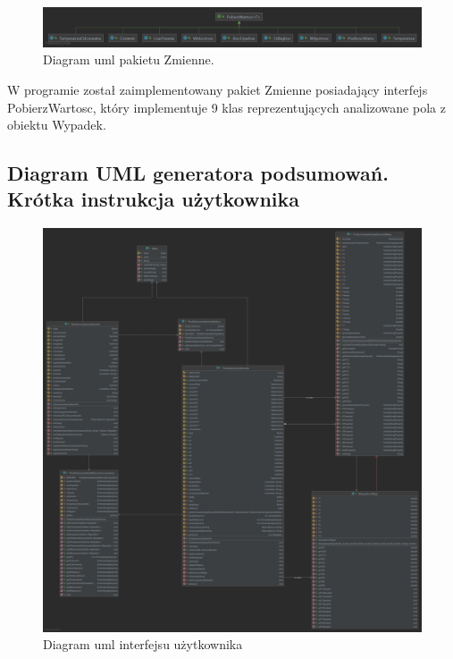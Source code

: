 \documentclass{classrep}
\begin{document}
\begin{figure}[h!]
 \centering
 \includegraphics[width=14cm]{uml_2.png}
 \vspace{-0.3cm}
 \caption{Diagram uml pakietu Zmienne. }
 \label{uml_zmienne}
\end{figure}


W programie został zaimplementowany pakiet Zmienne posiadający interfejs PobierzWartosc, który implementuje 9 klas reprezentujących analizowane pola z obiektu Wypadek. 

\newpage

\subsection{Diagram UML generatora podsumowań. Krótka instrukcja użytkownika} 


\begin{figure}[h!]
 \centering
 \includegraphics[width=15cm]{uml_3.png}
 \vspace{-0.3cm}
 \caption{Diagram uml interfejsu użytkownika }
 \label{uml_gui}
\end{figure}
\end{document}
